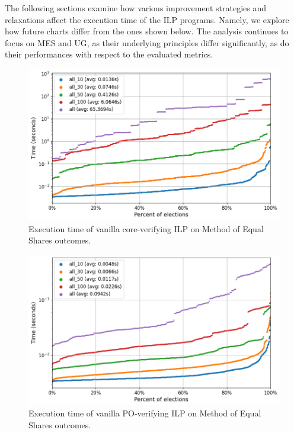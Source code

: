\documentclass[magisterska,en]{pracamgr}
\newcommand\chartsize{0.94}
\begin{document}
The following sections examine how various improvement strategies and relaxations affect the execution time of the ILP programs. Namely, we explore how future charts differ from the ones shown below. The analysis continues to focus on MES and UG, as their underlying principles differ significantly, as do their performances with respect to the evaluated metrics.

\begin{figure}[h!]
    \centering
    \includegraphics[width=\chartsize\linewidth]{outputs/NoOptimizations/mes-core.png}
    \caption{Execution time of vanilla core-verifying ILP on Method of Equal Shares outcomes.}
    \label{vanilla-mes-core}
\end{figure}

\begin{figure}[h!]
    \centering
    \includegraphics[width=\chartsize\linewidth]{outputs/NoOptimizations/mes-po.png}
    \caption{Execution time of vanilla PO-verifying ILP on Method of Equal Shares outcomes.}
    \label{vanilla-mes-po}
\end{figure}
\end{document}
